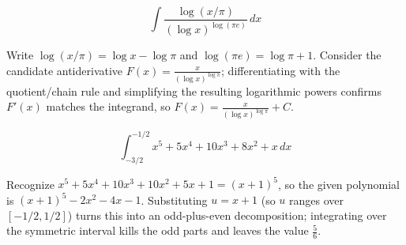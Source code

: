 \begin{questions}
\question
\[\int \frac{\log(x/\pi)}{(\log x)^{\log(\pi e)}}\,dx\]
\begin{solution}
Write $\log(x/\pi)=\log x-\log\pi$ and $\log(\pi e)=\log\pi+1$. Consider the candidate antiderivative $F(x)=\frac{x}{(\log x)^{\log\pi}}$; differentiating with the quotient/chain rule and simplifying the resulting logarithmic powers confirms $F'(x)$ matches the integrand, so $F(x)=\frac{x}{(\log x)^{\log\pi}}+C$.
\end{solution}

\question
\[\int_{-3/2}^{-1/2} x^5+5x^4+10x^3+8x^2+x\,dx\]
\begin{solution}
Recognize $x^5+5x^4+10x^3+10x^2+5x+1=(x+1)^5$, so the given polynomial is $(x+1)^5-2x^2-4x-1$. Substituting $u=x+1$ (so $u$ ranges over $[-1/2,1/2]$) turns this into an odd-plus-even decomposition; integrating over the symmetric interval kills the odd parts and leaves the value $\frac56$.
\end{solution}

\end{questions}


